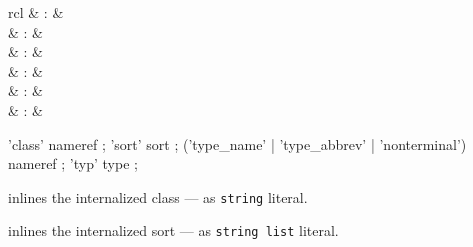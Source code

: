 \begin{isabellebody}
\begin{isamarkuptext}
\begin{description}
  \end{description}%
\end{isamarkuptext}%
\isamarkuptrue%
%
\endisatagmlref
{\isafoldmlref}%
%
\isadelimmlref
%
\endisadelimmlref
%
\isadelimmlantiq
%
\endisadelimmlantiq
%
\isatagmlantiq
%
\begin{isamarkuptext}%
\begin{matharray}{rcl}
  \hypertarget{ML antiquotation.class}{\hyperlink{ML antiquotation.class}{\mbox{}}} & : &  \\
  \hypertarget{ML antiquotation.sort}{\hyperlink{ML antiquotation.sort}{\mbox{}}} & : &  \\
  \hypertarget{ML antiquotation.type-name}{\hyperlink{ML antiquotation.type-name}{\mbox{}}} & : &  \\
  \hypertarget{ML antiquotation.type-abbrev}{\hyperlink{ML antiquotation.type-abbrev}{\mbox{}}} & : &  \\
  \hypertarget{ML antiquotation.nonterminal}{\hyperlink{ML antiquotation.nonterminal}{\mbox{}}} & : &  \\
  \hypertarget{ML antiquotation.typ}{\hyperlink{ML antiquotation.typ}{\mbox{}}} & : &  \\
  \end{matharray}

  \begin{rail}
  'class' nameref
  ;
  'sort' sort
  ;
  ('type\_name' | 'type\_abbrev' | 'nonterminal') nameref
  ;
  'typ' type
  ;
  \end{rail}

  \begin{description}

  \item {} inlines the internalized class  --- as \verb|string| literal.

  \item {} inlines the internalized sort 
  --- as \verb|string list| literal.


\end{description}
\end{isamarkuptext}
\end{isabellebody}
